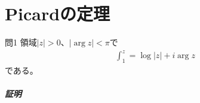 \chapter{Picardの定理}%

\begin{mysimplebox}{問1}
    領域$|z|>0$、$|\arg z|<\pi$で
    \begin{align*}
        \int_{1}^{z}=\log|z|+i\arg z
    \end{align*}
    である。
\end{mysimplebox}
\paragraph{証明}